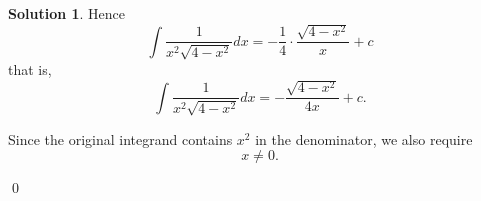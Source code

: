 \documentclass[a4paper]{article}
\theoremstyle{plain}
\theoremstyle{definition}
\newtheorem*{solution}{Solution}
\numberwithin{equation}{subsection}
\begin{document}
\begin{solution}
Hence
\[
    \int \frac{1}{x^2 \sqrt{4 - x^2}}dx
    = -\frac{1}{4}\cdot \frac{\sqrt{4-x^2}}{x} + c
\]
that is,
\[
    \int \frac{1}{x^2 \sqrt{4 - x^2}}dx
    = -\frac{\sqrt{4-x^2}}{4x} + c.
\]

Since the original integrand contains $x^2$ in the denominator, we also require
\[
    x \neq 0.
\]

\qed
\end{solution}
\end{document}
